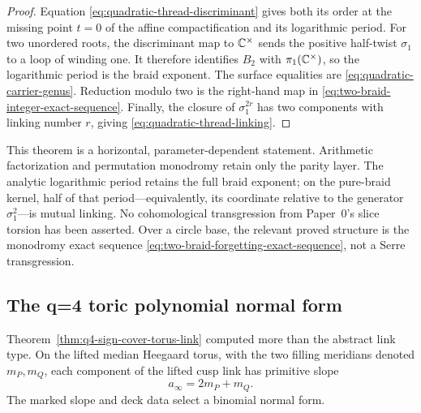 \begin{proof}
Equation \eqref{eq:quadratic-thread-discriminant} gives both its order at the
missing point $t=0$ of the affine compactification and its logarithmic period.
For two unordered roots, the discriminant map to $\mathbb{C}^\times$ sends the positive
half-twist $\sigma_1$ to a loop of winding one.  It therefore identifies
$B_2$ with $\pi_1(\mathbb{C}^\times)$, so the logarithmic period is the braid exponent.
The surface equalities are \eqref{eq:quadratic-carrier-genus}.  Reduction modulo
two is the right-hand map in \eqref{eq:two-braid-integer-exact-sequence}.
Finally, the closure of $\sigma_1^{2r}$ has two components with linking number
$r$, giving \eqref{eq:quadratic-thread-linking}.
\end{proof}

This theorem is a horizontal, parameter-dependent statement.  Arithmetic
factorization and permutation monodromy retain only the parity layer.  The
analytic logarithmic period retains the full braid exponent; on the pure-braid
kernel, half of that period---equivalently, its coordinate relative to the
generator $\sigma_1^2$---is mutual linking.  No cohomological transgression from
Paper~0's
slice torsion has been asserted.  Over a circle base, the relevant proved
structure is the monodromy exact sequence
\eqref{eq:two-braid-forgetting-exact-sequence}, not a Serre transgression.

\subsection{The q=4 toric polynomial normal form}

Theorem~\ref{thm:q4-sign-cover-torus-link} computed more than the abstract link
type.  On the lifted median Heegaard torus, with the two filling meridians denoted
$m_P,m_Q$, each component of the lifted cusp link has primitive slope
\begin{equation}
 a_\infty=2m_P+m_Q.
 \label{eq:q4-thread-slope-recall}
\end{equation}
The marked slope and deck data select a binomial normal form.


